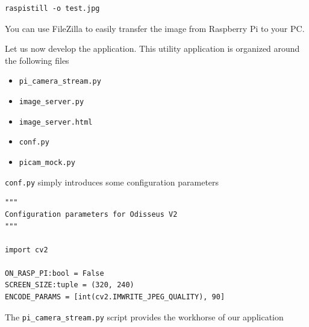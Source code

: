 \begin{lstlisting}
raspistill -o test.jpg
\end{lstlisting}

You can use FileZilla to easily transfer the image from Raspberry Pi to your PC.


Let us now develop the application. This utility application is organized around the following files

\begin{itemize}
\item \lstinline{pi_camera_stream.py}
\item \lstinline{image_server.py}
\item \lstinline{image_server.html}
\item \lstinline{conf.py}
\item \lstinline{picam_mock.py}
\end{itemize}

\lstinline{conf.py} simply introduces some configuration parameters

\begin{lstlisting}
"""
Configuration parameters for Odisseus V2
"""

import cv2

ON_RASP_PI:bool = False
SCREEN_SIZE:tuple = (320, 240)
ENCODE_PARAMS = [int(cv2.IMWRITE_JPEG_QUALITY), 90]
\end{lstlisting}

The \lstinline{pi_camera_stream.py} script provides the workhorse of our application

